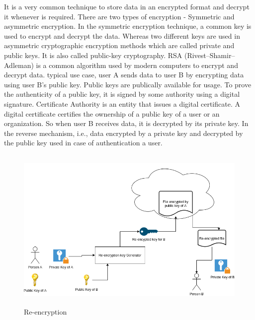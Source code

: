 It is a very common technique to store data in an encrypted format and decrypt it whenever is required. There are two types of encryption - Symmetric and asymmetric encryption. In the symmetric encryption technique, a common key is used to encrypt and decrypt the data. Whereas two different keys are used in asymmetric cryptographic encryption methods which are called private and public keys. It is also called public-key cryptography. RSA (Rivest–Shamir–Adleman) is a common algorithm used by modern computers to encrypt and decrypt data. 
typical use case, user A sends data to user B by encrypting data using user B's public key. Public keys are publically available for usage. To prove the authenticity of a public key, it is signed by some authority using a digital signature. Certificate Authority is an entity that issues a digital certificate. A digital certificate certifies the ownership of a public key of a user or an organization. So when user B receives data, it is decrypted by its private key. In the reverse mechanism, i.e., data encrypted by a private key and decrypted by the public key used in case of authentication a user.


\begin{figure}[htbp]
 \centering
 \includegraphics[width=1\textwidth, height=8cm]{gfx/figures/Re-encryption.png}
 \caption{Re-encryption}
 \label{fig:chapter03:reencryption}
\end{figure}

